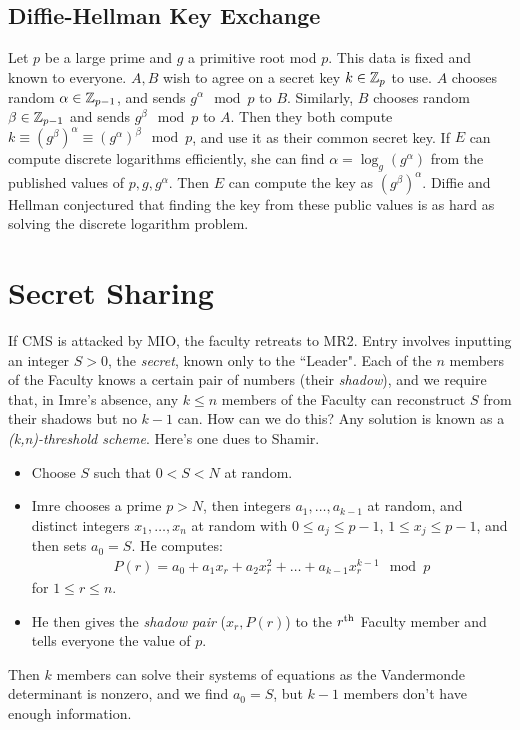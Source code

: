 \documentclass[10pt,a4paper]{article}
\begin{document}
\subsection{Diffie-Hellman Key Exchange}
Let $p$ be a large prime and $g$ a primitive root mod $p$. This data is fixed and known to everyone. $A,B$ wish to agree on a secret key $k \in \mathbb{Z}_p$ to use. $A$ chooses random $\alpha \in \mathbb{Z}_{p-1}$, and sends $g^\alpha \mod p$ to $B$. Similarly, $B$ chooses random $\beta \in \mathbb{Z}_{p-1}$ and sends $g^\beta \mod p$ to $A$. Then they both compute $k \equiv (g^\beta)^\alpha \equiv (g^\alpha)^\beta \mod p$, and use it as their common secret key. If $E$ can compute discrete logarithms efficiently, she can find $\alpha = \log_g(g^\alpha)$ from the published values of $p, g, g^\alpha$. Then $E$ can compute the key as $(g^\beta)^\alpha$. Diffie and Hellman conjectured that finding the key from these public values is as hard as solving the discrete logarithm problem.
\section{Secret Sharing}
If CMS is attacked by MIO, the faculty retreats to MR2. Entry involves inputting an integer $S>0$, the \emph{secret}, known only to the ``Leader". Each of the $n$ members of the Faculty knows a certain pair of numbers (their \emph{shadow}), and we require that, in Imre's absence, any $k \leq n$ members of the Faculty can reconstruct $S$ from their shadows but no $k-1$ can. How can we do this? Any solution is known as a \emph{(k,n)-threshold scheme}. Here's one dues to Shamir.
\begin{itemize}
\item Choose $S$ such that $0 < S< N$ at random.
\item Imre chooses a prime $p >N$, then integers $a_1, \ldots, a_{k-1}$ at random, and distinct integers $x_1, \ldots, x_n$ at random with $0 \leq a_j \leq p-1$, $1 \leq x_j \le p-1$, and then sets $a_0 = S$. He computes:
\begin{align*}
P(r) = a_0 + a_1 x_r + a_2 x_r^2 +\ldots +a_{k-1}x_r^{k-1} \mod p
\end{align*}
for $1 \leq r \leq n$.
\item He then gives the \emph{shadow pair} ($x_r, P(r)$) to the $r\textsuperscript{th}$ Faculty member and tells everyone the value of $p$.
\end{itemize}
Then $k$ members can solve their systems of equations as the Vandermonde determinant is nonzero, and we find $a_0 = S$, but $k-1$ members don't have enough information.
\end{document}
